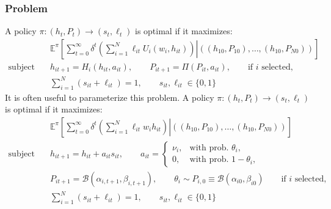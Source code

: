 \documentclass[10 pt]{article}
\newcommand{\gen}[1]{#1}
\newcommand{\gen}[1]{}
\newcommand{\sbr}[1]{\left[ #1 \right]}
\newcommand{\pr}[1]{\left( #1 \right)}
\begin{document}
\subsubsection{Problem}

\gen{
A policy $\pi: (h_t, P_t) \to (s_t, \ell_t)$ is optimal if it maximizes: 
\begin{align*}
& \mathbb{E}^\pi \sbr{
   \sum_{t=0}^\infty \delta^t 
   \left. \pr{\sum_{i=1}^N \ell_{it} U_i(w_i, h_{it})} \right\vert
   \pr{(h_{10}, P_{10}), \dots, (h_{10}, P_{N0})}
} \\
\text{subject to} \quad& h_{it+1} = H_i (h_{it}, a_{it}), \quad \quad
P_{it+1} = \Pi (P_{it}, a_{it}), 
\quad \quad \text{if $i$ selected,} \\
\quad& \sum_{i=1}^N (s_{it} + \ell_{it}) = 1, \quad \quad s_{it}, \ell_{it} \in \{0,1\}
\end{align*}
It is often useful to parameterize this problem.}
A policy $\pi: (h_t, P_t) \to (s_t, \ell_t)$ is optimal if it maximizes:
\begin{align*}
& \mathbb{E}^\pi \sbr{
   \sum_{t=0}^\infty \delta^t 
   \left. \pr{\sum_{i=1}^N \ell_{it} w_i h_{it}} \right\vert
   \pr{(h_{10}, P_{10}), \dots, (h_{10}, P_{N0})}
} \\
\text{subject to} \quad& h_{it+1} = h_{it}+ a_{it} s_{it}, \quad \quad a_{it} = 
   \begin{cases} 
      \nu_i, & \text{with prob. } \theta_i,  \\ 
      0, & \text{with prob. } 1 - \theta_i,
   \end{cases} 
   \\
\quad& P_{it+1} = \mathcal{B} (\alpha_{i,t+1}, \beta_{i,t+1}), 
   \quad \quad \theta_i \sim P_{i,0} \equiv \mathcal{B} (\alpha_{i0}, \beta_{i0})
   \quad \quad \text{if $i$ selected,} \\
\quad& \sum_{i=1}^N (s_{it} + \ell_{it}) = 1, \quad \quad s_{it}, \ell_{it} \in \{0,1\}
\end{align*}

\end{document}
